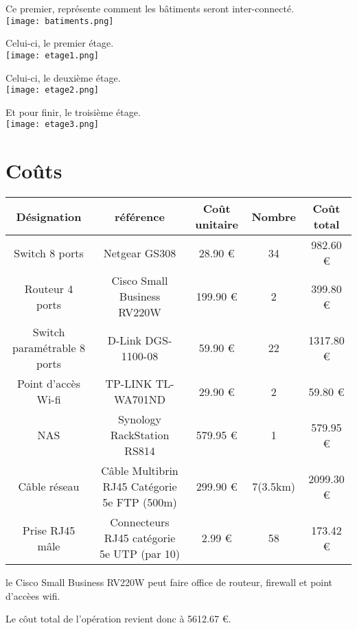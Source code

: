 \documentclass[oneside,10pt]{article}
\begin{document}
Ce premier, repr\'esente comment les b\^atiments seront inter-connect\'e.\\
\texttt{[image: batiments.png]} 

Celui-ci, le premier \'etage.\\
\texttt{[image: etage1.png]}

Celui-ci, le deuxi\`eme \'etage.\\
\texttt{[image: etage2.png]} 

Et pour finir, le troisi\`eme \'etage.\\
\texttt{[image: etage3.png]} 

\section{Co\^uts}
\begin{tabular}{|c|c|c|c|c|}
  \hline
  D\'esignation & r\'ef\'erence & Co\^ut unitaire & Nombre & Co\^ut total \\
  \hline \hline
  Switch 8 ports & Netgear GS308 & 28.90 \euro & 34 & 982.60 \euro \\
  \hline
  Routeur 4 ports & Cisco Small Business RV220W & 199.90 \euro & 2 & 399.80 \euro \\
  \hline
  Switch param\'etrable 8 ports & D-Link DGS-1100-08 & 59.90 \euro & 22 & 1317.80 \euro \\
  \hline
  Point d'acc\`es Wi-fi & TP-LINK TL-WA701ND & 29.90 \euro & 2 & 59.80 \euro \\
  \hline
  NAS & Synology RackStation RS814 & 579.95 \euro & 1 & 579.95 \euro \\
  \hline
  C\^able r\'eseau & C\^able Multibrin RJ45 Cat\'egorie 5e FTP (500m) & 299.90 \euro & 7(3.5km) & 2099.30 \euro \\
  \hline
  Prise RJ45 m\^ale & Connecteurs RJ45 cat\'egorie 5e UTP (par 10) & 2.99 \euro & 58 & 173.42 \euro \\
  \hline

\end{tabular}

le Cisco Small Business RV220W  peut faire office de routeur, firewall et point d'acc\`ees wifi.

Le c\^out total de l'op\'eration revient donc \`a 5612.67 \euro.
\end{document}
